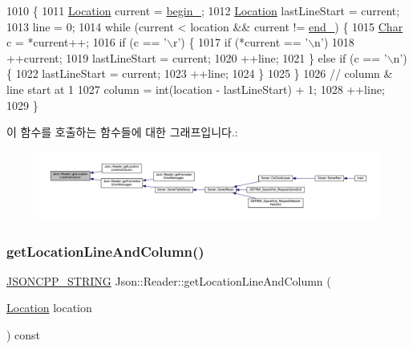\begin{DoxyCode}
1010                                                          \{
1011   \hyperlink{class_json_1_1_reader_a46795b5b272bf79a7730e406cb96375a}{Location} current = \hyperlink{class_json_1_1_reader_a327166839022ea91f0a8290960a8af76}{begin\_};
1012   \hyperlink{class_json_1_1_reader_a46795b5b272bf79a7730e406cb96375a}{Location} lastLineStart = current;
1013   line = 0;
1014   \textcolor{keywordflow}{while} (current < location && current != \hyperlink{class_json_1_1_reader_a714793579cbf4ee7c5a7223d2c8d77c1}{end\_}) \{
1015     \hyperlink{class_json_1_1_reader_a3eec9118f3e9a672ba8348c3a79d0f45}{Char} c = *current++;
1016     \textcolor{keywordflow}{if} (c == \textcolor{charliteral}{'\(\backslash\)r'}) \{
1017       \textcolor{keywordflow}{if} (*current == \textcolor{charliteral}{'\(\backslash\)n'})
1018         ++current;
1019       lastLineStart = current;
1020       ++line;
1021     \} \textcolor{keywordflow}{else} \textcolor{keywordflow}{if} (c == \textcolor{charliteral}{'\(\backslash\)n'}) \{
1022       lastLineStart = current;
1023       ++line;
1024     \}
1025   \}
1026   \textcolor{comment}{// column & line start at 1}
1027   column = int(location - lastLineStart) + 1;
1028   ++line;
1029 \}
\end{DoxyCode}
이 함수를 호출하는 함수들에 대한 그래프입니다.\+:\nopagebreak
\begin{figure}[H]
\begin{center}
\leavevmode
\includegraphics[width=350pt]{class_json_1_1_reader_a8b2fb6af24382c3914fd4643b092c675_icgraph}
\end{center}
\end{figure}
\mbox{\label{class_json_1_1_reader_a49757dec5a1a53eff388dc7bf2bda890}} 
\subsubsection{\texorpdfstring{get\+Location\+Line\+And\+Column()}{getLocationLineAndColumn()}\hspace{0.1cm}{\footnotesize\ttfamily [2/2]}}
{\footnotesize\ttfamily \hyperlink{json_8h_a1e723f95759de062585bc4a8fd3fa4be}{J\+S\+O\+N\+C\+P\+P\+\_\+\+S\+T\+R\+I\+NG} Json\+::\+Reader\+::get\+Location\+Line\+And\+Column (\begin{DoxyParamCaption}\item[{\hyperlink{class_json_1_1_reader_a46795b5b272bf79a7730e406cb96375a}{Location}}]{location }\end{DoxyParamCaption}) const\hspace{0.3cm}{\ttfamily [private]}}



